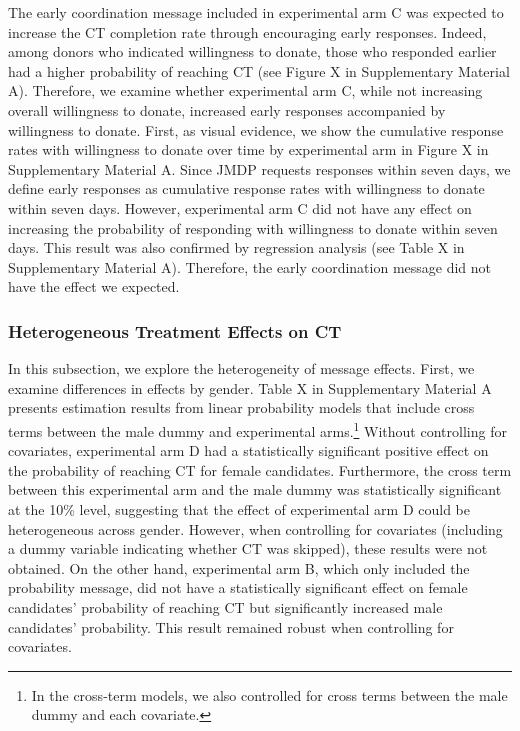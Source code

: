 \documentclass[12pt, a4paper]{article}
\begin{document}
The early coordination message included in experimental arm C was expected to increase the CT completion rate through encouraging early responses. Indeed, among donors who indicated willingness to donate, those who responded earlier had a higher probability of reaching CT (see Figure X in Supplementary Material A). Therefore, we examine whether experimental arm C, while not increasing overall willingness to donate, increased early responses accompanied by willingness to donate. First, as visual evidence, we show the cumulative response rates with willingness to donate over time by experimental arm in Figure X in Supplementary Material A. Since JMDP requests responses within seven days, we define early responses as cumulative response rates with willingness to donate within seven days. However, experimental arm C did not have any effect on increasing the probability of responding with willingness to donate within seven days. This result was also confirmed by regression analysis (see Table X in Supplementary Material A). Therefore, the early coordination message did not have the effect we expected.

\hypertarget{heterogeneous-treatment-effects-on-ct}{%
\subsubsection{Heterogeneous Treatment Effects on CT}\label{heterogeneous-treatment-effects-on-ct}}

In this subsection, we explore the heterogeneity of message effects. First, we examine differences in effects by gender. Table X in Supplementary Material A presents estimation results from linear probability models that include cross terms between the male dummy and experimental arms.\footnote{In the cross-term models, we also controlled for cross terms between the male dummy and each covariate.} Without controlling for covariates, experimental arm D had a statistically significant positive effect on the probability of reaching CT for female candidates. Furthermore, the cross term between this experimental arm and the male dummy was statistically significant at the 10\% level, suggesting that the effect of experimental arm D could be heterogeneous across gender. However, when controlling for covariates (including a dummy variable indicating whether CT was skipped), these results were not obtained. On the other hand, experimental arm B, which only included the probability message, did not have a statistically significant effect on female candidates' probability of reaching CT but significantly increased male candidates' probability. This result remained robust when controlling for covariates.
\end{document}
